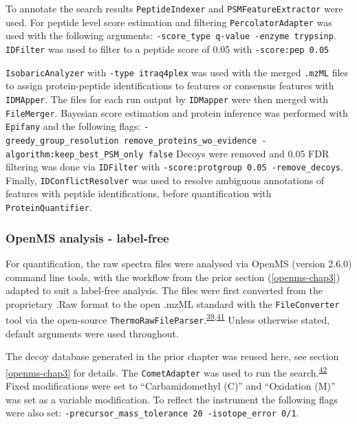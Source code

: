 \documentclass[
]{article}
\begin{document}
To annotate the search results \texttt{PeptideIndexer} and \texttt{PSMFeatureExtractor} were used.
For peptide level score estimation and filtering \texttt{PercolatorAdapter} was used with the following arguments: \texttt{-score\_type\ q-value\ -enzyme\ trypsinp}.
\texttt{IDFilter} was used to filter to a peptide score of 0.05 with \texttt{-score:pep\ 0.05}

\texttt{IsobaricAnalyzer} with \texttt{-type\ itraq4plex} was used with the merged \texttt{.mzML} files to assign protein-peptide identifications to features or consensus features with \texttt{IDMApper}.
The files for each run output by \texttt{IDMapper} were then merged with \texttt{FileMerger}.
Bayesian score estimation and protein inference was performed with \texttt{Epifany} and the following flags: \texttt{-greedy\_group\_resolution\ remove\_proteins\_wo\_evidence\ -algorithm:keep\_best\_PSM\_only\ false}
Decoys were removed and 0.05 FDR filtering was done via \texttt{IDFilter} with \texttt{-score:protgroup\ 0.05\ -remove\_decoys}.
Finally, \texttt{IDConflictResolver} was used to resolve ambiguous annotations of features with peptide identifications, before quantification with \texttt{ProteinQuantifier}.

\hypertarget{openms-label-free}{%
\subsubsection{OpenMS analysis - label-free}\label{openms-label-free}}

For quantification, the raw spectra files were analysed via OpenMS (version 2.6.0) command line tools, with the workflow from the prior section (\ref{openms-chap3}) adapted to suit a label-free analysis.
The files were first converted from the proprietary .Raw format to the open .mzML standard with the \texttt{FileConverter} tool via the open-source \texttt{ThermoRawFileParser}.\textsuperscript{\protect\hyperlink{ref-rost_openms_2016}{39},\protect\hyperlink{ref-hulstaert_thermorawfileparser_2020}{41}}
Unless otherwise stated, default arguments were used throughout.

The decoy database generated in the prior chapter was reused here, see section \ref{openms-chap3} for details.
The \texttt{CometAdapter} was used to run the search.\textsuperscript{\protect\hyperlink{ref-eng_comet_2013}{42}}
Fixed modifications were set to ``Carbamidomethyl (C)'' and ``Oxidation (M)'' was set as a variable modification.
To reflect the instrument the following flags were also set: \texttt{-precursor\_mass\_tolerance\ 20\ -isotope\_error\ 0/1}.
\end{document}
